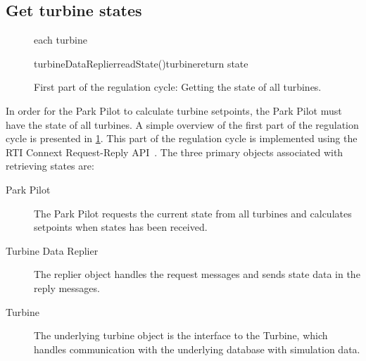 \subsection{Get turbine states}\label{sec:getTurbineStates}

\begin{figure}
	\centering
	\begin{sequencediagram} %
	
		\begin{sdblock}{each turbine}{}
			\begin {call}{turbineDataReplier}{readState()}{turbine}{return state}
			\end {call}
		\end{sdblock}				
	\end{sequencediagram}

	\caption[First part of the regulation cycle]{
		\label{fig:getStatesOfTurbines} 
		\footnotesize{%
			First part of the regulation cycle: Getting the state of all turbines.
		}
	}
\end{figure}
In order for the Park Pilot to calculate turbine setpoints, the Park Pilot must have the state of all turbines.
A simple overview of the first part of the regulation cycle is presented in \cref{fig:getStatesOfTurbines}. This part of the regulation cycle is implemented using the RTI Connext Request-Reply API~\cite{rtiConnextUsersManual}. The three primary objects associated with retrieving states are:

\begin{description}
	\item [Park Pilot] The Park Pilot requests the current state from all turbines and calculates setpoints when states has been received.
	\item [Turbine Data Replier] The replier object handles the request messages and sends state data in the reply messages.
	\item [Turbine] The underlying turbine object is the interface to the Turbine, which handles communication with the underlying database with simulation data.
\end{description}

